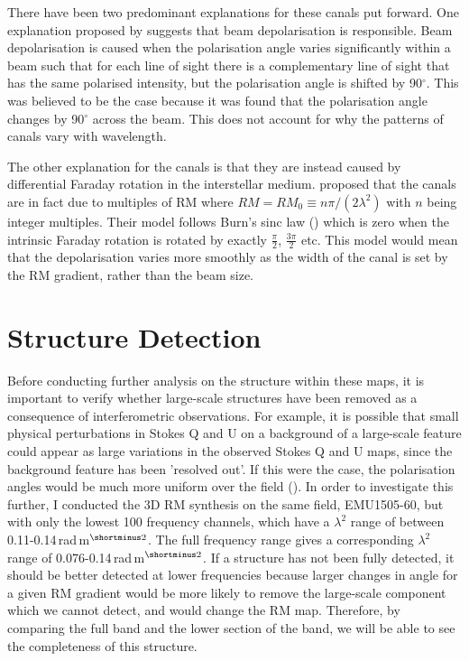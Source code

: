 There have been two predominant explanations for these canals put forward. One explanation proposed by \cite{Haverkornetal_2000} suggests that beam depolarisation is responsible. Beam depolarisation is caused when the polarisation angle varies significantly within a beam such that for each line of sight there is a complementary line of sight that has the same polarised intensity, but the polarisation angle is shifted by 90$^\circ$. This was believed to be the case because it was found that the polarisation angle changes by 90$^\circ$ across the beam. This does not account for why the patterns of canals vary with wavelength.

The other explanation for the canals is that they are instead caused by differential Faraday rotation in the interstellar medium. %
\cite{Shukurov_and_Berkhuijsen_2003} proposed that the canals are in fact due to multiples of RM where $RM = RM_0 \equiv n\pi / (2\lambda^2)$ with $n$ being integer multiples. Their model follows Burn's sinc law (\cite{burn_1966}) which is zero when the intrinsic Faraday rotation is rotated by exactly $\frac{\pi}{2}$, $\frac{3\pi}{2}$ etc. This model would mean that the depolarisation varies more smoothly as the width of the canal is set by the RM gradient, rather than the beam size.

\section{Structure Detection}

Before conducting further analysis on the structure within these maps, it is important to verify whether large-scale structures have been removed as a consequence of interferometric observations. For example, it is possible that small physical perturbations in Stokes Q and U on a background of a large-scale feature could appear as large variations in the observed Stokes Q and U maps, since the background feature has been 'resolved out'. If this were the case, the polarisation angles would be much more uniform over the field (\cite{Haverkorn_2004}). In order to investigate this further, I conducted the 3D RM synthesis on the same field, EMU1505-60, but with only the lowest 100 frequency channels, which have a $\lambda^2$ range of between 0.11-0.14$\,$rad$\,$m$^{\shortminus2}$. The full frequency range gives a corresponding $\lambda^2$ range of 0.076-0.14$\,$rad$\,$m$^{\shortminus2}$. If a structure has not been fully detected, it should be better detected at lower frequencies because larger changes in angle for a given RM gradient would be more likely to remove the large-scale component which we cannot detect, and would change the RM map. Therefore, by comparing the full band and the lower section of the band, we will be able to see the completeness of this structure. 

